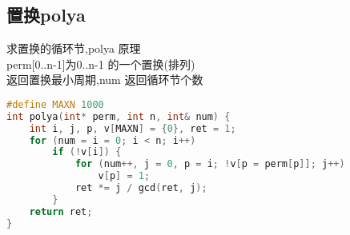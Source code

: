\subsection{置换polya}
求置换的循环节,polya 原理\\
perm[0..n-1]为0..n-1 的一个置换(排列)\\
返回置换最小周期,num 返回循环节个数\\
		\begin{lstlisting}[language=c++]
#define MAXN 1000
int polya(int* perm, int n, int& num) {
    int i, j, p, v[MAXN] = {0}, ret = 1;
    for (num = i = 0; i < n; i++)
        if (!v[i]) {
            for (num++, j = 0, p = i; !v[p = perm[p]]; j++)
                v[p] = 1;
            ret *= j / gcd(ret, j);
        }
    return ret;
}
		\end{lstlisting}
